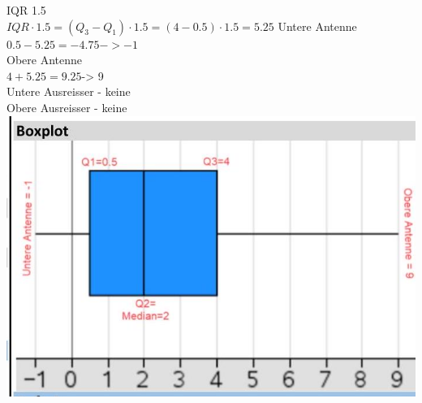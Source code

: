 \documentclass[10pt]{article}
\begin{document}
{IQR 1.5\\
$I Q R \cdot 1.5=\left(Q_{3}-Q_{1}\right) \cdot 1.5=(4-0.5) \cdot 1.5=5.25$ Untere Antenne\\
$0.5-5.25=-4.75->-1$\\
Obere Antenne\\
$4+5.25=9.25$-> 9\\
Untere Ausreisser - keine\\
Obere Ausreisser - keine\\
\includegraphics[max width=\textwidth, center]{2024_12_29_0906b02acf849bda8665g-5(16)}

}
\end{document}
